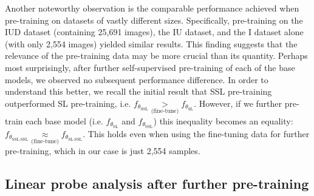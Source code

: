 \documentclass[a4paper,fleqn]{cas-dc}
\begin{document}
Another noteworthy observation is the comparable performance achieved when pre-training on datasets of vastly different sizes. Specifically, pre-training on the IUD dataset (containing 25,691 images), the IU dataset, and the I dataset alone (with only 2,554 images) yielded similar results. This finding suggests that the relevance of the pre-training data may be more crucial than its quantity. Perhaps most surprisingly, after further self-supervised pre-training of each of the base models, we observed no subsequent performance difference. In order to understand this better, we recall the initial result that SSL pre-training outperformed SL pre-training, i.e. $f_{\theta_{\scriptscriptstyle\text{SSL}}}\underset{\scriptscriptstyle\text{(fine-tune)}}{>} f_{\theta_{\scriptscriptstyle\text{SL}}}$. However, if we further pre-train each base model (i.e. $f_{\theta_{\scriptscriptstyle\text{SL}}}$ and $f_{\theta_{\scriptscriptstyle\text{SSL}}}$)  this inequality becomes an equality: $f_{\theta_{\scriptscriptstyle\text{SSL-SSL}}}\underset{\scriptscriptstyle\text{(fine-tune)}}{\approx} f_{\theta_{\scriptscriptstyle\text{SL-SSL}}}$. This holds even when using the fine-tuning data for further pre-training, which in our case is just 2,554 samples.


\subsection{Linear probe analysis after further pre-training}
\end{document}
